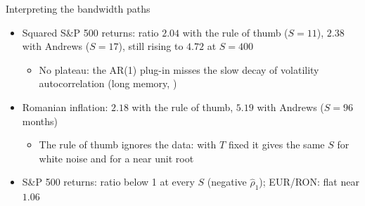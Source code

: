 \begin{frame}{Interpreting the bandwidth paths}
\itemsize{\small}
\begin{itemize}
    \item Squared S\&P 500 returns: ratio $2.04$ with the rule of thumb ($S = 11$), $2.38$ with Andrews ($S = 17$), still rising to $4.72$ at $S = 400$
    \begin{itemize}
        \item No plateau: the AR(1) plug-in misses the slow decay of volatility autocorrelation (long memory, )
    \end{itemize}
    \item Romanian inflation: $2.18$ with the rule of thumb, $5.19$ with Andrews ($S = 96$ months)
    \begin{itemize}
        \item The rule of thumb ignores the data: with $T$ fixed it gives the same $S$ for white noise and for a near unit root
    \end{itemize}
    \item S\&P 500 returns: ratio below 1 at every $S$ (negative $\hat\rho_1$); EUR/RON: flat near $1.06$
\end{itemize}
\end{frame}

